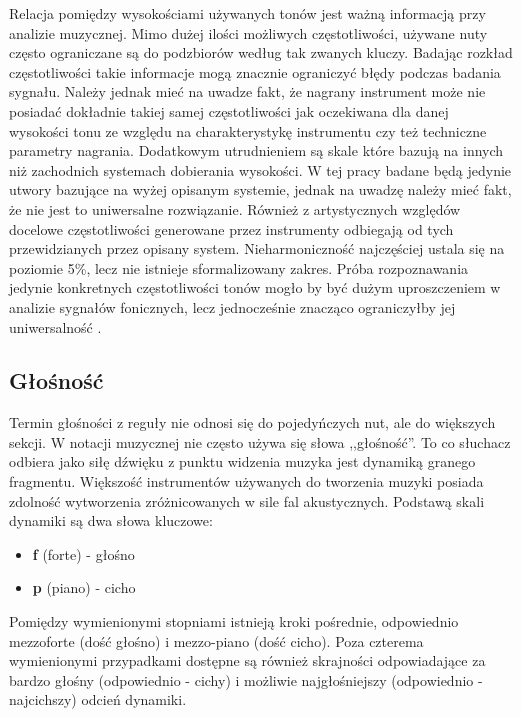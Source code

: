 \documentclass[12pt,a4paper,twoside]{mwart}
\begin{document}
Relacja pomiędzy wysokościami używanych tonów jest ważną informacją przy analizie muzycznej. Mimo dużej ilości możliwych częstotliwości, używane nuty często ograniczane są do podzbiorów według tak zwanych kluczy. Badając rozkład częstotliwości takie informacje mogą znacznie ograniczyć błędy podczas badania sygnału. Należy jednak mieć na uwadze fakt, że nagrany instrument może nie posiadać dokładnie takiej samej częstotliwości jak oczekiwana dla danej wysokości tonu ze względu na charakterystykę instrumentu czy też techniczne parametry nagrania. Dodatkowym utrudnieniem są skale które bazują na innych niż zachodnich systemach dobierania wysokości. W tej pracy badane będą jedynie utwory bazujące na wyżej opisanym systemie, jednak na uwadzę należy mieć fakt, że nie jest to uniwersalne rozwiązanie. Również z artystycznych względów docelowe częstotliwości generowane przez instrumenty odbiegają od tych przewidzianych przez opisany system. Nieharmoniczność najczęściej ustala się na poziomie 5\%, lecz nie istnieje sformalizowany zakres. Próba rozpoznawania jedynie konkretnych częstotliwości tonów mogło by być dużym uproszczeniem w analizie sygnałów fonicznych, lecz jednocześnie znacząco ograniczyłby jej uniwersalność \cite[64-65]{Homerecording:DlaKazdego} \cite[7-11]{Transcription:Anssi:SignalProcessingMethods}.

\subsection{Głośność}
Termin głośności z reguły nie odnosi się do pojedyńczych nut, ale do większych sekcji. W notacji muzycznej nie często używa się słowa ,,głośność''. To co słuchacz odbiera jako siłę dźwięku z punktu widzenia muzyka jest dynamiką granego fragmentu. Większość instrumentów używanych do tworzenia muzyki posiada zdolność wytworzenia zróżnicowanych w sile fal akustycznych. Podstawą skali dynamiki są dwa słowa kluczowe:

\begin{itemize}
  \item \textbf{f} (forte) - głośno
  \item \textbf{p} (piano) - cicho
\end{itemize}

Pomiędzy wymienionymi stopniami istnieją kroki pośrednie, odpowiednio mezzo\-forte (dość głośno) i mezzo-piano (dość cicho). Poza czterema wymienionymi przypadkami dostępne są również skrajności odpowiadające za bardzo głośny (odpowiednio - cichy) i możliwie najgłośniejszy (odpowiednio - najcichszy) odcień dynamiki.
\end{document}
